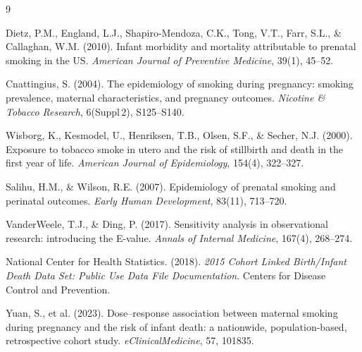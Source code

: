 \documentclass[11pt]{article}
\begin{document}

{\small
\begin{thebibliography}{9}

Dietz, P.M., England, L.J., Shapiro-Mendoza, C.K., Tong, V.T., Farr, S.L., \& Callaghan, W.M. (2010).
Infant morbidity and mortality attributable to prenatal smoking in the US.
\textit{American Journal of Preventive Medicine}, 39(1), 45--52.

Cnattingius, S. (2004).
The epidemiology of smoking during pregnancy: smoking prevalence, maternal characteristics, and pregnancy outcomes.
\textit{Nicotine \& Tobacco Research}, 6(Suppl\,2), S125--S140.

Wisborg, K., Kesmodel, U., Henriksen, T.B., Olsen, S.F., \& Secher, N.J. (2000).
Exposure to tobacco smoke in utero and the risk of stillbirth and death in the first year of life.
\textit{American Journal of Epidemiology}, 154(4), 322--327.

Salihu, H.M., \& Wilson, R.E. (2007).
Epidemiology of prenatal smoking and perinatal outcomes.
\textit{Early Human Development}, 83(11), 713--720.

VanderWeele, T.J., \& Ding, P. (2017).
Sensitivity analysis in observational research: introducing the E-value.
\textit{Annals of Internal Medicine}, 167(4), 268--274.

National Center for Health Statistics. (2018).
\textit{2015 Cohort Linked Birth/Infant Death Data Set: Public Use Data File Documentation}.
Centers for Disease Control and Prevention.

Yuan, S., et al. (2023).
Dose--response association between maternal smoking during pregnancy
and the risk of infant death: a nationwide, population-based,
retrospective cohort study.
\textit{eClinicalMedicine}, 57, 101835.

\end{thebibliography}
}
\end{document}
